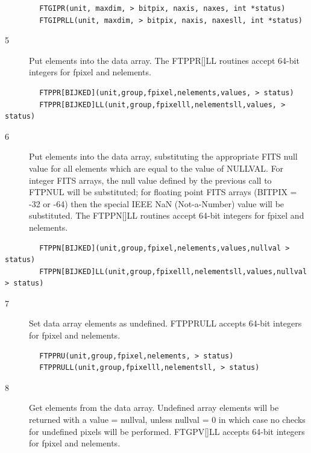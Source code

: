 \documentclass[11pt]{book}
\begin{document}
\begin{verbatim}
        FTGIPR(unit, maxdim, > bitpix, naxis, naxes, int *status)
        FTGIPRLL(unit, maxdim, > bitpix, naxis, naxesll, int *status)
\end{verbatim}

\begin{description}
\item[5 ]Put elements into the data array.  The FTPPR[]LL routines
      accept 64-bit integers for fpixel and nelements.
\end{description}

\begin{verbatim}
        FTPPR[BIJKED](unit,group,fpixel,nelements,values, > status)
        FTPPR[BIJKED]LL(unit,group,fpixelll,nelementsll,values, > status)
\end{verbatim}

\begin{description}
\item[6 ]Put elements into the data array, substituting the appropriate FITS null
   value for all elements which are equal to the value of NULLVAL.  For
   integer FITS arrays, the null value defined by the previous call to FTPNUL
   will be substituted;  for floating point FITS arrays (BITPIX = -32
   or -64) then the special IEEE NaN (Not-a-Number) value will be
  substituted.  The FTPPN[]LL routines accept 64-bit integers for 
  fpixel and nelements.
\end{description}

\begin{verbatim}
        FTPPN[BIJKED](unit,group,fpixel,nelements,values,nullval > status)
        FTPPN[BIJKED]LL(unit,group,fpixelll,nelementsll,values,nullval > status)
\end{verbatim}

\begin{description}
\item[7 ]Set data array elements as undefined.  FTPPRULL accepts 64-bit integers
         for fpixel and nelements.
\end{description}

\begin{verbatim}
        FTPPRU(unit,group,fpixel,nelements, > status)
        FTPPRULL(unit,group,fpixelll,nelementsll, > status)
\end{verbatim}

\begin{description}
\item[8 ] Get elements from the data array.  Undefined array elements will be
    returned with a value = nullval, unless nullval = 0 in which case no
   checks for undefined pixels will be performed.  FTGPV[]LL accepts
   64-bit integers for fpixel and nelements.
\end{description}
\end{document}
